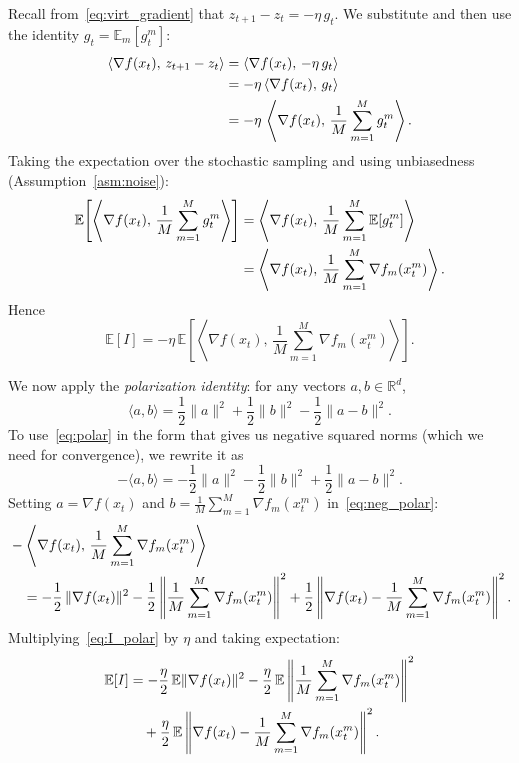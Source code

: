\documentclass{article}
\begin{document}
Recall from~\eqref{eq:virt_gradient} that $z_{t+1} - z_t = -\eta\,g_t$.
We substitute and then use the identity $g_t = \mathbb{E}_m[g_t^m]$:
\begin{align}
\langle \nabla f(x_t),\, z_{t+1} - z_t \rangle
&= \langle \nabla f(x_t),\, -\eta\,g_t \rangle \notag \\
&= -\eta\,\langle \nabla f(x_t),\, g_t \rangle \notag \\
&= -\eta\,\left\langle \nabla f(x_t),\,
   \frac{1}{M}\sum_{m=1}^{M} g_t^m \right\rangle.
\label{eq:I_start}
\end{align}
Taking the expectation over the stochastic sampling and using unbiasedness
(Assumption~\ref{asm:noise}):
\begin{align}
\mathbb{E}\!\left[\left\langle \nabla f(x_t),\,
   \frac{1}{M}\sum_{m=1}^{M} g_t^m \right\rangle\right]
&= \left\langle \nabla f(x_t),\,
   \frac{1}{M}\sum_{m=1}^{M} \mathbb{E}[g_t^m] \right\rangle \notag \\
&= \left\langle \nabla f(x_t),\,
   \frac{1}{M}\sum_{m=1}^{M} \nabla f_m(x_t^m) \right\rangle.
\label{eq:I_unbiased}
\end{align}
Hence
\begin{equation}
\mathbb{E}[I]
= -\eta\,\mathbb{E}\!\left[\left\langle \nabla f(x_t),\,
   \frac{1}{M}\sum_{m=1}^{M} \nabla f_m(x_t^m) \right\rangle\right].
\label{eq:I_expect}
\end{equation}

We now apply the \emph{polarization identity}: for any vectors
$a, b \in \mathbb{R}^d$,
\begin{equation}
\langle a, b \rangle
= \frac{1}{2}\|a\|^2 + \frac{1}{2}\|b\|^2
  - \frac{1}{2}\|a - b\|^2.
\label{eq:polar}
\end{equation}
To use~\eqref{eq:polar} in the form that gives us negative squared norms
(which we need for convergence), we rewrite it as
\begin{equation}
-\langle a, b \rangle
= -\frac{1}{2}\|a\|^2 - \frac{1}{2}\|b\|^2
  + \frac{1}{2}\|a - b\|^2.
\label{eq:neg_polar}
\end{equation}
Setting $a = \nabla f(x_t)$ and
$b = \frac{1}{M}\sum_{m=1}^{M}\nabla f_m(x_t^m)$
in~\eqref{eq:neg_polar}:
\begin{align}
&-\left\langle \nabla f(x_t),\,
   \frac{1}{M}\sum_{m=1}^{M}\nabla f_m(x_t^m) \right\rangle \notag \\
&\quad= -\frac{1}{2}\,\|\nabla f(x_t)\|^2
  - \frac{1}{2}\left\|\frac{1}{M}\sum_{m=1}^{M}
    \nabla f_m(x_t^m)\right\|^2
  + \frac{1}{2}\left\|\nabla f(x_t)
    - \frac{1}{M}\sum_{m=1}^{M}\nabla f_m(x_t^m)\right\|^2.
\label{eq:I_polar}
\end{align}
Multiplying~\eqref{eq:I_polar} by $\eta$ and taking expectation:
\begin{align}
\mathbb{E}[I]
&= -\frac{\eta}{2}\,\mathbb{E}\|\nabla f(x_t)\|^2
  - \frac{\eta}{2}\,\mathbb{E}\left\|\frac{1}{M}\sum_{m=1}^{M}
    \nabla f_m(x_t^m)\right\|^2 \notag \\
&\quad+ \frac{\eta}{2}\,\mathbb{E}\left\|\nabla f(x_t)
    - \frac{1}{M}\sum_{m=1}^{M}\nabla f_m(x_t^m)\right\|^2.
\label{eq:I_three}
\end{align}
\end{document}
